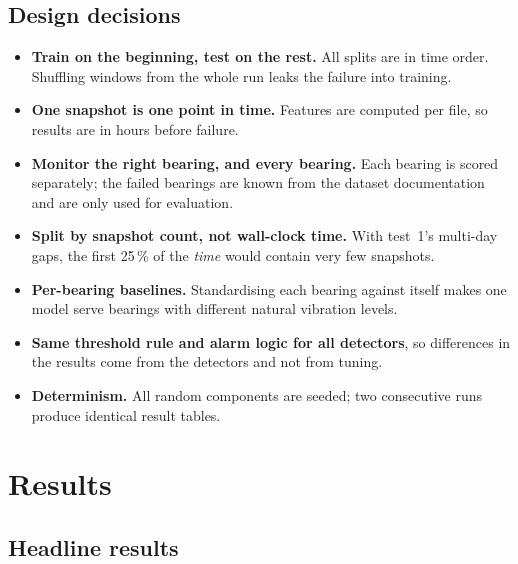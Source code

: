 \documentclass[11pt]{article}
\begin{document}
\subsection{Design decisions}
\label{sec:design}
\begin{itemize}
  \item \textbf{Train on the beginning, test on the rest.} All splits are in time order. Shuffling
        windows from the whole run leaks the failure into training.
  \item \textbf{One snapshot is one point in time.} Features are computed per file, so results are in
        hours before failure.
  \item \textbf{Monitor the right bearing, and every bearing.} Each bearing is scored separately; the
        failed bearings are known from the dataset documentation and are only used for evaluation.
  \item \textbf{Split by snapshot count, not wall-clock time.} With test~1's multi-day gaps, the first
        25\,\% of the \emph{time} would contain very few snapshots.
  \item \textbf{Per-bearing baselines.} Standardising each bearing against itself makes one model
        serve bearings with different natural vibration levels.
  \item \textbf{Same threshold rule and alarm logic for all detectors}, so differences in the results
        come from the detectors and not from tuning.
  \item \textbf{Determinism.} All random components are seeded; two consecutive runs produce identical
        result tables.
\end{itemize}

\section{Results}
\label{sec:results}

\subsection{Headline results}
\end{document}
